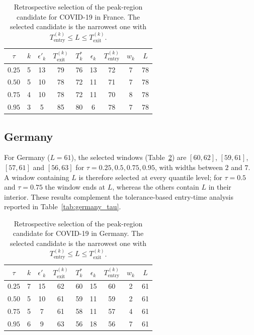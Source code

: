 \documentclass[12pt,a4paper]{article}
\begin{document}
\begin{table}[htbp]
	\centering
	\caption{Retrospective selection of the peak-region candidate for
		COVID-19 in France.
		The selected candidate is the narrowest one with
		$T_{\mathrm{entry}}^{(k)}\le L\le T_{\mathrm{exit}}^{(k)}$.}
	\label{tab:france_entry_exit}
	\begin{tabular}{c|cccccccc}
		\toprule
		$\tau$ &
		$k$ &
		$\epsilon'_k$ &
		$T_{\mathrm{exit}}^{(k)}$ &
		$T_k^*$ &
		$\epsilon_k$ &
		$T_{\mathrm{entry}}^{(k)}$ &
		$w_k$ &
		$L$ \\
		\midrule
		$0.25$ & 5 & 13 & 79 & 76 & 13 & 72 & 7  & 78 \\
		$0.50$ & 5 & 10 & 78 & 72 & 11 & 71 & 7 & 78 \\
		$0.75$ & 4 & 10 & 78 & 72 & 11 & 70 & 8 & 78 \\
		$0.95$ & 3 & 5 & 85 & 80 & 6 & 78 & 7 & 78 \\
		\bottomrule
	\end{tabular}
\end{table}

\subsection{Germany}
\label{subsec:germany}

For Germany ($L=61$), the selected windows
(Table~\ref{tab:germany_entry_exit}) are $[60,62]$, $[59,61]$,
$[57,61]$ and $[56,63]$ for $\tau=0.25,0.5,0.75,0.95$, with widths
between $2$ and $7$. A window containing $L$ is therefore selected at
every quantile level; for $\tau=0.5$ and $\tau=0.75$ the window ends at
$L$, whereas the others contain $L$ in their interior.
These results complement the tolerance-based entry-time analysis reported in Table~\ref{tab:germany_tau}.

\begin{table}[htbp]
	\centering
	\caption{Retrospective selection of the peak-region candidate for
		COVID-19 in Germany.
		The selected candidate is the narrowest one with
		$T_{\mathrm{entry}}^{(k)}\le L\le T_{\mathrm{exit}}^{(k)}$.}
	\label{tab:germany_entry_exit}
	\begin{tabular}{c|cccccccc}
		\toprule
		$\tau$ &
		$k$ &
		$\epsilon'_k$ &
		$T_{\mathrm{exit}}^{(k)}$ &
		$T_k^*$ &
		$\epsilon_k$ &
		$T_{\mathrm{entry}}^{(k)}$ &
		$w_k$ &
		$L$ \\
		\midrule
		$0.25$ & 7 & 15 & 62 & 60 & 15 & 60 & 2 & 61 \\
		$0.50$ & 5 & 10 & 61 & 59 & 11 & 59 & 2 & 61 \\
		$0.75$ & 5 & 7 & 61 & 58 & 11 & 57 & 4 & 61 \\
		$0.95$ & 6 & 9  & 63 & 56 & 18 & 56 & 7 & 61 \\
		\bottomrule
	\end{tabular}
\end{table}
\end{document}
